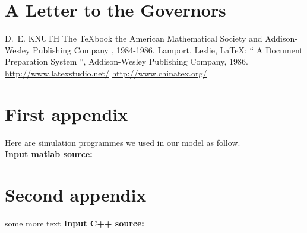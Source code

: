 \documentclass{mcmthesis}
\begin{document}
\section{A Letter to the Governors}


\begin{thebibliography}{99}
 D.~E. KNUTH   The \TeX{}book  the American
Mathematical Society and Addison-Wesley
Publishing Company , 1984-1986.
Lamport, Leslie,  \LaTeX{}: `` A Document Preparation System '',
Addison-Wesley Publishing Company, 1986.
\url{http://www.latexstudio.net/}
\url{http://www.chinatex.org/}
\end{thebibliography}

\begin{appendices}

\section{First appendix}

\lipsum[13]

Here are simulation programmes we used in our model as follow.\\

\textbf{\textcolor[rgb]{0.98,0.00,0.00}{Input matlab source:}}


\section{Second appendix}

some more text \textcolor[rgb]{0.98,0.00,0.00}{\textbf{Input C++ source:}}


\end{appendices}
\end{document}
